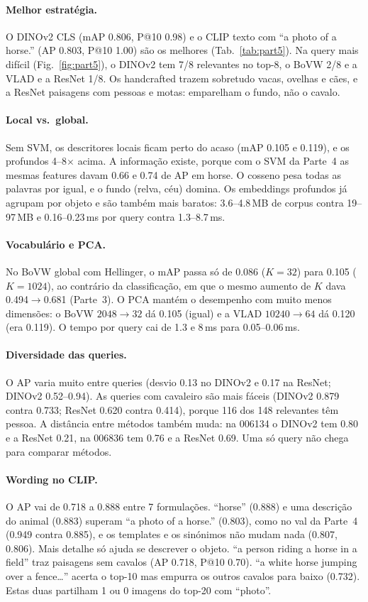 \paragraph{Melhor estratégia.}
O DINOv2 CLS (mAP 0.806, P@10 0.98) e o CLIP texto com ``a photo of a
horse.'' (AP 0.803, P@10 1.00) são os melhores (Tab.~\ref{tab:part5}). Na query
mais difícil (Fig.~\ref{fig:part5}), o DINOv2 tem 7/8 relevantes no top-8, o
BoVW 2/8 e a VLAD e a ResNet 1/8. Os handcrafted trazem sobretudo vacas, ovelhas
e cães, e a ResNet paisagens com pessoas e motas: emparelham o fundo, não o cavalo.

\paragraph{Local vs.\ global.}
Sem SVM, os descritores locais ficam perto do acaso (mAP 0.105 e 0.119), e os
profundos 4--8$\times$ acima. A informação existe, porque com o SVM da Parte~4
as mesmas features davam 0.66 e 0.74 de AP em horse. O cosseno pesa todas as
palavras por igual, e o fundo (relva, céu) domina. Os embeddings profundos já
agrupam por objeto e são também mais baratos: 3.6--4.8\,MB de corpus contra
19--97\,MB e 0.16--0.23\,ms por query contra 1.3--8.7\,ms.

\paragraph{Vocabulário e PCA.}
No BoVW global com Hellinger, o mAP passa só de 0.086 ($K{=}32$) para 0.105
($K{=}1024$), ao contrário da classificação, em que o mesmo aumento de $K$ dava
0.494$\to$0.681 (Parte~3). O PCA mantém o desempenho com muito menos dimensões: o BoVW
$2048\to32$ dá 0.105 (igual) e a VLAD $10240\to64$ dá 0.120 (era 0.119). O
tempo por query cai de 1.3 e 8\,ms para 0.05--0.06\,ms.

\paragraph{Diversidade das queries.}
O AP varia muito entre queries (desvio 0.13 no DINOv2 e 0.17 na ResNet; DINOv2
0.52--0.94). As queries com cavaleiro são mais fáceis (DINOv2 0.879 contra 0.733;
ResNet 0.620 contra 0.414), porque 116 dos 148 relevantes têm pessoa. A distância
entre métodos também muda: na 006134 o DINOv2 tem 0.80 e a ResNet 0.21, na 006836
tem 0.76 e a ResNet 0.69. Uma só query não chega para comparar métodos.

\paragraph{Wording no CLIP.}
O AP vai de 0.718 a 0.888 entre 7 formulações. ``horse'' (0.888) e uma
descrição do animal (0.883) superam ``a photo of a horse.'' (0.803), como no
val da Parte~4 (0.949 contra 0.885), e os
templates e os sinónimos não mudam nada (0.807, 0.806). Mais detalhe só ajuda
se descrever o objeto. ``a person riding a horse in a field'' traz paisagens sem
cavalos (AP 0.718, P@10 0.70). ``a white horse jumping over a fence\dots''
acerta o top-10 mas empurra os outros cavalos para baixo (0.732). Estas duas
partilham 1 ou 0 imagens do top-20 com ``photo''.

